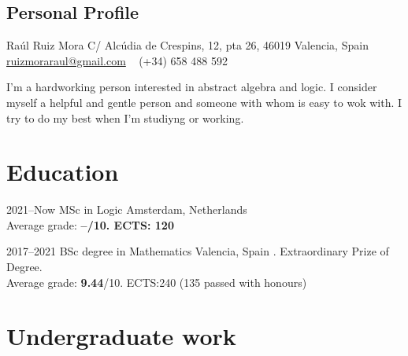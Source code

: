 \documentclass[]{cv-style}          %
\begin{document}
\lastupdated


\begin{aside}
%
\section{Personal Profile}
Raúl Ruiz Mora
C/ Alcúdia de Crespins,
12, pta 26, 46019
Valencia, Spain
~
\href{mailto:ruizmoraraul@gmail.com}{\small ruizmoraraul@gmail.com}
~
(+34) 658 488 592
\end{aside}

\vspace{1cm}

I'm a hardworking person interested in abstract algebra and logic. I consider myself a helpful and gentle person and someone with whom is easy to wok with. I try to do my best when I'm studiyng or working.

\section{Education}

\begin{entrylist}
\entry
    {2021--Now}
    {MSc in Logic}
    {Amsterdam, Netherlands}
    {\\
    Average grade: \bf --/10. ECTS: 120}

\entry
    {2017--2021}
    {BSc degree in Mathematics}
    {Valencia, Spain}
    {. Extraordinary Prize of Degree.\\
    Average grade: {\bf 9.44}/10. ECTS:240 (135 passed with honours)}
\end{entrylist}

\section{Undergraduate work}
\end{document}
